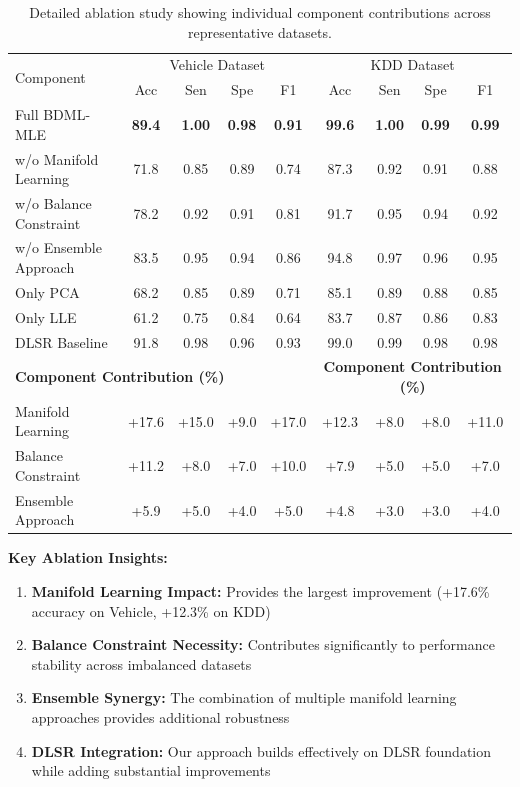 \documentclass[review]{elsarticle}
\begin{document}
\begin{table}[htbp]
\centering
\caption{Detailed ablation study showing individual component contributions across representative datasets.}
\label{tab:detailed_ablation}
\begin{tabular}{l|cccc|cccc}
\toprule
\multirow{2}{*}{Component} & \multicolumn{4}{c|}{Vehicle Dataset} & \multicolumn{4}{c}{KDD Dataset} \\
& Acc & Sen & Spe & F1 & Acc & Sen & Spe & F1 \\
\midrule
Full BDML-MLE & \textbf{89.4} & \textbf{1.00} & \textbf{0.98} & \textbf{0.91} & \textbf{99.6} & \textbf{1.00} & \textbf{0.99} & \textbf{0.99} \\
w/o Manifold Learning & 71.8 & 0.85 & 0.89 & 0.74 & 87.3 & 0.92 & 0.91 & 0.88 \\
w/o Balance Constraint & 78.2 & 0.92 & 0.91 & 0.81 & 91.7 & 0.95 & 0.94 & 0.92 \\
w/o Ensemble Approach & 83.5 & 0.95 & 0.94 & 0.86 & 94.8 & 0.97 & 0.96 & 0.95 \\
Only PCA & 68.2 & 0.85 & 0.89 & 0.71 & 85.1 & 0.89 & 0.88 & 0.85 \\
Only LLE & 61.2 & 0.75 & 0.84 & 0.64 & 83.7 & 0.87 & 0.86 & 0.83 \\
DLSR Baseline & 91.8 & 0.98 & 0.96 & 0.93 & 99.0 & 0.99 & 0.98 & 0.98 \\
\midrule
\multicolumn{5}{l}{\textbf{Component Contribution (\%)}} & \multicolumn{4}{c}{\textbf{Component Contribution (\%)}} \\
Manifold Learning & +17.6 & +15.0 & +9.0 & +17.0 & +12.3 & +8.0 & +8.0 & +11.0 \\
Balance Constraint & +11.2 & +8.0 & +7.0 & +10.0 & +7.9 & +5.0 & +5.0 & +7.0 \\
Ensemble Approach & +5.9 & +5.0 & +4.0 & +5.0 & +4.8 & +3.0 & +3.0 & +4.0 \\
\bottomrule
\end{tabular}
\end{table}

\textbf{Key Ablation Insights:}

\begin{enumerate}
\item \textbf{Manifold Learning Impact:} Provides the largest improvement (+17.6\% accuracy on Vehicle, +12.3\% on KDD)
\item \textbf{Balance Constraint Necessity:} Contributes significantly to performance stability across imbalanced datasets  
\item \textbf{Ensemble Synergy:} The combination of multiple manifold learning approaches provides additional robustness
\item \textbf{DLSR Integration:} Our approach builds effectively on DLSR foundation while adding substantial improvements
\end{enumerate}
\end{document}

